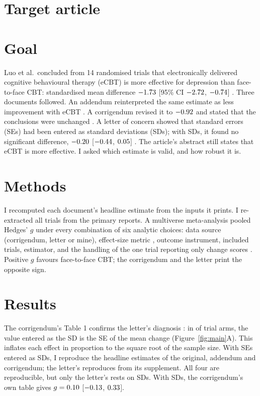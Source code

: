 \documentclass{JRR}
\begin{document}
\linenumbers

\section*{Target article}

\section{Goal}
\label{sec:goal}

Luo et al.\ concluded from 14 randomised trials that electronically delivered cognitive behavioural therapy (eCBT) is more effective for depression than face-to-face CBT: standardised mean difference $-1.73$ [95\% CI $-2.72$, $-0.74$] \cite{luo2020}. Three documents followed. An addendum reinterpreted the same estimate as less improvement with eCBT \cite{luo2020addendum}. A corrigendum revised it to $-0.92$ and stated that the conclusions were unchanged \cite{sanger2021corrigendum}. A letter of concern showed that standard errors (SEs) had been entered as standard deviations (SDs); with SDs, it found no significant difference, $-0.20$ [$-0.44$, $0.05$] \cite{kriston2022concerns}. The article's abstract still states that eCBT is more effective. I asked which estimate is valid, and how robust it is.

\section{Methods}
\label{sec:methods}

I recomputed each document's headline estimate from the inputs it prints. I re-extracted all trials from the primary reports. A multiverse meta-analysis \cite{simonsohn2020specification, plessen2023multiverse} pooled Hedges' $g$ under every combination of six analytic choices: data source (corrigendum, letter or mine), effect-size metric \cite{becker1988, morris2008}, outcome instrument, included trials, estimator, and the handling of the one trial reporting only change scores \cite{wright2005}. Positive $g$ favours face-to-face CBT; the corrigendum and the letter print the opposite sign.

\section{Results}
\label{sec:results}

The corrigendum's Table 1 confirms the letter's diagnosis \cite{kriston2022concerns}: in \nArmsMatch{} of \nArms{} trial arms, the value entered as the SD is the SE of the mean change (Figure~\ref{fig:main}A). This inflates each effect in proportion to the square root of the sample size. With SEs entered as SDs, I reproduce the headline estimates of the original, addendum and corrigendum; the letter's reproduces from its supplement. All four are reproducible, but only the letter's rests on SDs. With SDs, the corrigendum's own table gives $g = 0.10$ [$-0.13$, $0.33$].
\end{document}
